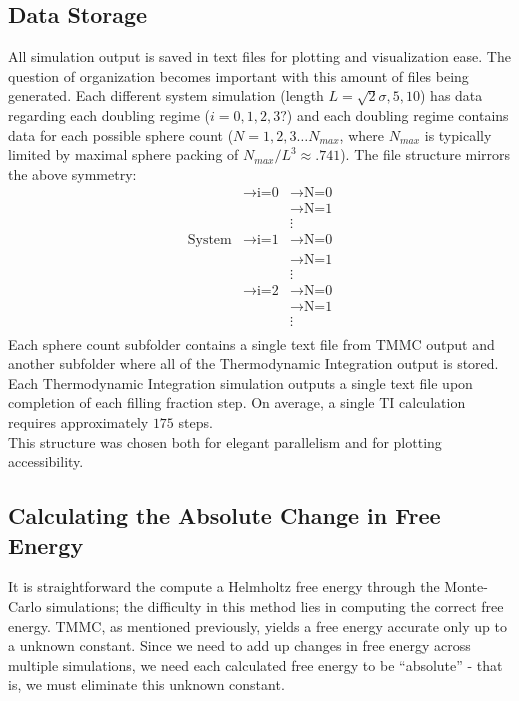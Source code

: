 \documentclass[12pt]{article}
\newcommand{\ignore}[1]{}
\begin{document}
\ignore{NB: is there a more physical reason we chose this filling fraction increase?}

\subsection{Data Storage}
All simulation output is saved in text files for plotting and visualization ease. The question of organization becomes important with this amount of files being generated. Each different system simulation (length $L = \sqrt2 \sigma, 5,10$) has data regarding each doubling regime ($i=0,1,2,3?$) and each doubling regime contains data for each possible sphere count ($N=1,2,3\dots N_{max}$, where $N_{max}$ is typically limited by maximal sphere packing of $N_{max}/L^3\approx.741$). The file structure mirrors the above symmetry: 
\begin{align*}
                &\rightarrow \text{i=0} &\rightarrow \text{N=0}\\
                & &\rightarrow \text{N=1}\\
                && \vdots\\
\text{System} & \rightarrow \text{i=1} &\rightarrow \text{N=0}\\
                && \rightarrow \text{N=1}\\
                &&\vdots\\
                &\rightarrow \text{i=2} &\rightarrow \text{N=0}\\
                && \rightarrow \text{N=1}\\
                &&\vdots\\
\end{align*}
Each sphere count subfolder contains a single text file from TMMC output and another subfolder where all of the Thermodynamic Integration output is stored. Each Thermodynamic Integration simulation outputs a single text file upon completion of each filling fraction step. On average, a single TI calculation requires approximately $175$ steps. \\
This structure was chosen both for elegant parallelism and for plotting accessibility. 

\subsection{Calculating the Absolute Change in Free Energy}
It is straightforward the compute a Helmholtz free energy through the Monte-Carlo simulations; the difficulty in this method lies in computing the correct free energy. TMMC, as mentioned previously, yields a free energy accurate only up to a unknown constant. Since we need to add up changes in free energy across multiple simulations, we need each calculated free energy to be ``absolute'' - that is, we must eliminate this unknown constant. \\
\end{document}
